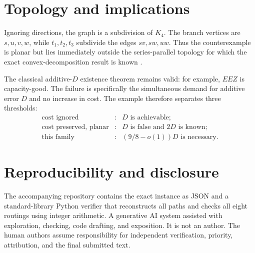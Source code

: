 \documentclass[11pt]{article}
\theoremstyle{definition}
\newcommand{\1}{\mathbf{1}}
\begin{document}
\section{Topology and implications}

Ignoring directions, the graph is a subdivision of $K_4$.  The branch
vertices are $s,u,v,w$, while $t_1,t_2,t_3$ subdivide the edges $sv,sw,uw$.
Thus the counterexample is planar but lies immediately outside the
series-parallel topology for which the exact convex-decomposition result is
known \citep{AlmoghrabiSkutellaWarode2024}.

The classical additive-$D$ existence theorem remains valid: for example,
$EEZ$ is capacity-good.  The failure is specifically the simultaneous demand
for additive error $D$ and no increase in cost.  The example therefore
separates three thresholds:
\[
\begin{array}{ccl}
\text{cost ignored} &:& D\text{ is achievable};\\
\text{cost preserved, planar} &:& D\text{ is false and }2D\text{ is known};\\
\text{this family} &:& (9/8-o(1))D\text{ is necessary}.
\end{array}
\]

\section*{Reproducibility and disclosure}

The accompanying repository contains the exact instance as JSON and a
standard-library Python verifier that reconstructs all paths and checks all
eight routings using integer arithmetic.  A generative AI system assisted
with exploration, checking, code drafting, and exposition.  It is not an
author.  The human authors assume responsibility for independent
verification, priority, attribution, and the final submitted text.



\end{document}
